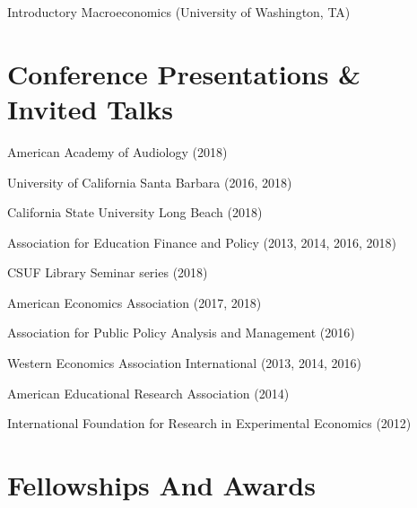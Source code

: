 \documentclass[11pt,a4paper,sans]{moderncv}
\begin{document}
Introductory Macroeconomics (University of Washington, TA)



\section{Conference Presentations \& Invited Talks}  
  
American Academy of Audiology (2018)



University of California Santa Barbara (2016, 2018)



California State University Long Beach (2018)



Association for Education Finance and Policy (2013, 2014, 2016, 2018)



CSUF Library Seminar series (2018)



American Economics Association (2017, 2018)



Association for Public Policy Analysis and Management (2016)



Western Economics Association International (2013, 2014, 2016)



American Educational Research Association (2014)



International Foundation for Research in Experimental Economics (2012)



\section{Fellowships And Awards}  
  
       
\end{document}
